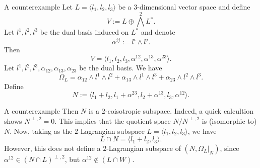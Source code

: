 \begin{frame}{A counterexample}
Let $L = \langle l_1, l_2, l_3\rangle$ be a $3$-dimensional vector space and define $$V:= L \oplus \bigwedge^2 L^\ast.$$ Let $l^1, l^2, l^3$ be the dual basis induced on $L^\ast$ and denote $$\alpha^{ij} := l^i \wedge l^j.$$ Then $$V = \langle l_1, l_2, l_3, \alpha^{12}, \alpha^{13}, \alpha^{23}\rangle.$$ Let $l^1, l^2, l^3, \alpha_{12}, \alpha_{13}, \alpha_{23}$ be the dual basis. We have $$\Omega_L = \alpha_{12} \wedge l^1 \wedge l^2 + \alpha_{13} \wedge l^1 \wedge l^3 + \alpha_{23}\wedge l^2 \wedge l^3.$$ Define $$N := \langle l_1 + l_2, l_1 + \alpha^{23}, l_2 + \alpha^{13}, l_3, \alpha^{12}\rangle.$$ 

\end{frame}
\begin{frame}{A counterexample}
Then $N$ is a $2$-coisotropic subspace. Indeed, a quick calcultion shows $N^{\perp, 2} = 0$. This implies that the quotient space $N/N^{\perp, 2}$ is (isomorphic to) $N.$ Now, taking as the $2$-Lagrangian subspace $L = \langle l_1, l_2,l_3\rangle$, we have $$L \cap N = \langle l_1 + l_2 , l_3 \rangle.$$ However, this does not define a $2$-Lagrangian subspace of $(N, \Omega_L |_N)$, since $\alpha^{12} \in (N \cap L)^{\perp, 2}$, but $ \alpha^{12} \not \in(L \cap W).$
    
\end{frame}

